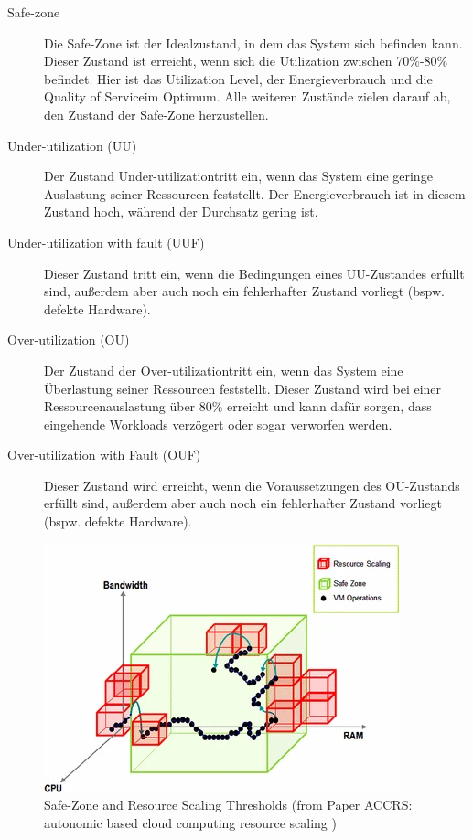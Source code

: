\documentclass[a4paper,10pt]{scrartcl}
\begin{document}
\begin{description}
\item[Safe-zone]
Die Safe-Zone ist der Idealzustand, in dem das System sich befinden kann. Dieser Zustand ist erreicht, wenn sich die Utilization zwischen 70\%-80\% befindet. Hier ist das Utilization Level, der Energieverbrauch und die \glqq Quality of Service\grqq im Optimum.
Alle weiteren Zustände zielen darauf ab, den Zustand der Safe-Zone herzustellen.
\item[Under-utilization (UU)]
Der Zustand \glqq Under-utilization\grqq tritt ein, wenn das System eine geringe Auslastung seiner Ressourcen feststellt. Der Energieverbrauch ist in diesem Zustand hoch, während der Durchsatz gering ist.
\item[Under-utilization with fault (UUF)]
Dieser Zustand tritt ein, wenn die Bedingungen eines UU-Zustandes erfüllt sind, außerdem aber auch noch ein fehlerhafter Zustand vorliegt (bspw. defekte Hardware).
\item[Over-utilization (OU)]
Der Zustand der \glqq Over-utilization\grqq tritt ein, wenn das System eine Überlastung seiner Ressourcen feststellt. Dieser Zustand wird bei einer Ressourcenauslastung über 80\% erreicht und kann dafür sorgen, dass eingehende Workloads verzögert oder sogar verworfen werden.
\item[Over-utilization with Fault (OUF)]
Dieser Zustand wird erreicht, wenn die Voraussetzungen des OU-Zustands erfüllt sind, außerdem aber auch noch ein fehlerhafter Zustand vorliegt (bspw. defekte Hardware).
\end{description}

\begin{figure}[htbp]
  \centering
  \includegraphics[scale=1.2]{img/SDTScaling.png}
  \caption{Safe-Zone and Resource Scaling Thresholds (from Paper ACCRS: autonomic based cloud computing resource scaling \cite{AlSharif.2016} )}
\end{figure}
\end{document}
